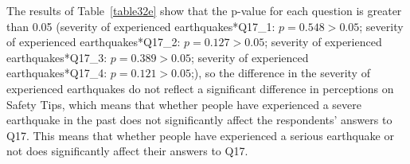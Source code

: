 The results of Table~\ref{table32e} show that the p-value for each question is greater than 0.05 (severity of experienced earthquakes*Q17\_1: $p=0.548>0.05$; severity of experienced earthquakes*Q17\_2: $p=0.127>0.05$; severity of experienced earthquakes*Q17\_3: $p=0.389>0.05$; severity of experienced earthquakes*Q17\_4: $p=0.121>0.05$;), so the difference in the severity of experienced earthquakes do not reflect a significant difference in perceptions on Safety Tips, which means that whether people have experienced a severe earthquake in the past does not significantly affect the respondents' answers to Q17. This means that whether people have experienced a serious earthquake or not does significantly affect their answers to Q17.






